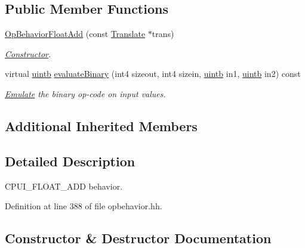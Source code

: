 \subsection*{Public Member Functions}
\begin{DoxyCompactItemize}
\item 
\mbox{\hyperlink{class_op_behavior_float_add_a52e9ffd0432fde78980fb52b9d167177}{Op\+Behavior\+Float\+Add}} (const \mbox{\hyperlink{class_translate}{Translate}} $\ast$trans)
\begin{DoxyCompactList}\small\item\em \mbox{\hyperlink{class_constructor}{Constructor}}. \end{DoxyCompactList}\item 
virtual \mbox{\hyperlink{types_8h_a2db313c5d32a12b01d26ac9b3bca178f}{uintb}} \mbox{\hyperlink{class_op_behavior_float_add_a84fffa2528cb3928759345a67d79424f}{evaluate\+Binary}} (int4 sizeout, int4 sizein, \mbox{\hyperlink{types_8h_a2db313c5d32a12b01d26ac9b3bca178f}{uintb}} in1, \mbox{\hyperlink{types_8h_a2db313c5d32a12b01d26ac9b3bca178f}{uintb}} in2) const
\begin{DoxyCompactList}\small\item\em \mbox{\hyperlink{class_emulate}{Emulate}} the binary op-\/code on input values. \end{DoxyCompactList}\end{DoxyCompactItemize}
\subsection*{Additional Inherited Members}


\subsection{Detailed Description}
C\+P\+U\+I\+\_\+\+F\+L\+O\+A\+T\+\_\+\+A\+DD behavior. 

Definition at line 388 of file opbehavior.\+hh.



\subsection{Constructor \& Destructor Documentation}
\mbox{\label{class_op_behavior_float_add_a52e9ffd0432fde78980fb52b9d167177}} 
